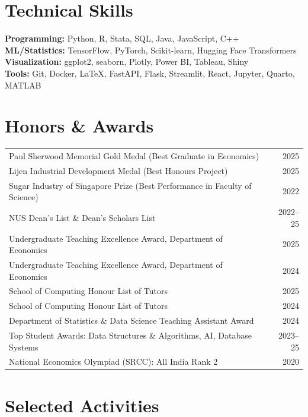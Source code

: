 \documentclass[10pt,a4paper]{article}
\begin{document}
\section{Technical Skills}

\textbf{Programming:} Python, R, Stata, SQL, Java, JavaScript, C++\\
\textbf{ML/Statistics:} TensorFlow, PyTorch, Scikit-learn, Hugging Face Transformers\\
\textbf{Visualization:} ggplot2, seaborn, Plotly, Power BI, Tableau, Shiny\\
\textbf{Tools:} Git, Docker, \LaTeX, FastAPI, Flask, Streamlit, React, Jupyter, Quarto, MATLAB

\section{Honors \& Awards}

\begin{tabularx}{\textwidth}{@{}X r@{}}
Paul Sherwood Memorial Gold Medal (Best Graduate in Economics) & 2025 \\
Lijen Industrial Development Medal (Best Honours Project) & 2025 \\
Sugar Industry of Singapore Prize (Best Performance in Faculty of Science) & 2022 \\
NUS Dean's List \& Dean's Scholars List & 2022--25 \\
Undergraduate Teaching Excellence Award, Department of Economics & 2025 \\
Undergraduate Teaching Excellence Award, Department of Economics & 2024 \\
School of Computing Honour List of Tutors & 2025 \\
School of Computing Honour List of Tutors & 2024 \\
Department of Statistics \& Data Science Teaching Assistant Award & 2024 \\
Top Student Awards: Data Structures \& Algorithms, AI, Database Systems &  2023--25\\
National Economics Olympiad (SRCC): All India Rank 2 & 2020 \\
\end{tabularx}

\section{Selected Activities}
\end{document}

